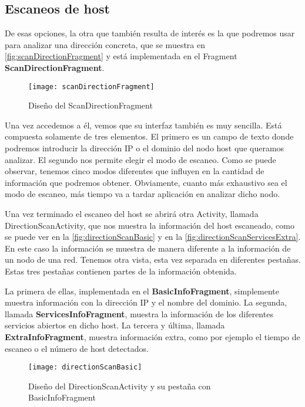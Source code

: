 \subsection{Escaneos de host}

De esas opciones, la otra que también resulta de interés es la que podremos usar para analizar una dirección concreta, que se muestra en \autoref{fig:scanDirectionFragment} y está implementada en el Fragment \textbf{ScanDirectionFragment}.

\begin{figure}[H]
	\centering
	\texttt{[image: scanDirectionFragment]}
	\caption{Diseño del ScanDirectionFragment}
	\label{fig:scanDirectionFragment}
\end{figure}

Una vez accedemos a él, vemos que su interfaz también es muy sencilla. Está compuesta solamente de tres elementos. El primero es un campo de texto donde podremos introducir la dirección IP o el dominio del nodo host que queramos analizar. El segundo nos permite elegir el modo de escaneo. Como se puede observar, tenemos cinco modos diferentes que influyen en la cantidad de información que podremos obtener. Obviamente, cuanto más exhaustivo sea el modo de escaneo, más tiempo va a tardar aplicación en analizar dicho nodo.

Una vez terminado el escaneo del host se abrirá otra Activity, llamada DirectionScanActivity,  que nos muestra la información del host escaneado, como se puede ver en la \autoref{fig:directionScanBasic} y en la \autoref{fig:directionScanServicesExtra}. En este caso la información se muestra de manera diferente a la información de un nodo de una red. Tenemos otra vista, esta vez separada en diferentes pestañas. Estas tres pestañas contienen partes de la información obtenida.

La primera de ellas, implementada en el \textbf{BasicInfoFragment}, simplemente muestra información con la dirección IP y el nombre del dominio. La segunda, llamada \textbf{ServicesInfoFragment}, muestra la información de los diferentes servicios abiertos en dicho host. La tercera y última, llamada \textbf{ExtraInfoFragment}, muestra información extra, como por ejemplo el tiempo de escaneo o el número de host detectados.

\begin{figure}[H]
	\centering
	\texttt{[image: directionScanBasic]}
	\caption{Diseño del DirectionScanActivity y su pestaña con BasicInfoFragment}
	\label{fig:directionScanBasic}
\end{figure}

